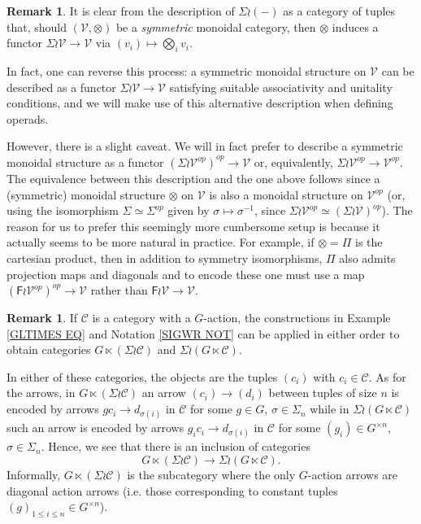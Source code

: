 \documentclass[a4paper,10pt
,draft
]{article}%
\numberwithin{equation}{section}
\numberwithin{figure}{section}
\theoremstyle{definition} %
\newtheorem{remark}[equation]{Remark}%
\newcommand{\V}{\ensuremath{\mathcal V}}
\newcommand{\C}{\ensuremath{\mathcal C}}
\newcommand{\1}{\ensuremath{\mathbbm 1}}%
\begin{document}
\begin{remark}
It is clear from the description
of $\Sigma \wr (-)$
as a category of tuples that, 
should $(\V,\otimes)$ be a \emph{symmetric} monoidal category,
then $\otimes$
induces a functor
$\Sigma \wr \V \to \mathcal{V}$
via $(v_i) \mapsto \bigotimes_i v_i$.

In fact, one can reverse this process: a symmetric monoidal structure on $\V$ can be described as a functor
$\Sigma \wr \V \to \V$
satisfying suitable associativity and unitality conditions, and we will make use of this alternative description when defining operads.

However, there is a slight caveat. 
We will in fact prefer to describe a symmetric monoidal structure
as a functor
$\left(\Sigma \wr \V^{op}\right)^{op} \to \V$
or, equivalently, 
$\Sigma \wr \V^{op} \to \V^{op}$.
The equivalence between this description and the one above
follows since a (symmetric) monoidal structure $\otimes$ on $\V$ is also a monoidal structure on $\V^{op}$
(or, using the isomorphism
$\Sigma \simeq \Sigma^{op}$ given by $\sigma \mapsto \sigma^{-1}$,
since $\Sigma \wr \V^{op} \simeq \left(\Sigma \wr \V \right)^{op}$).
The reason for us to prefer this seemingly more cumbersome setup is because it actually seems to be more natural in practice.
For example, if $\otimes = \Pi$ is the cartesian product, 
then in addition to symmetry isomorphisms, 
$\Pi$ also admits projection maps and diagonals and to encode these one must use a map
$\left(\mathsf{F} \wr \mathcal{V}^{op}\right)^{op} \to \mathcal{V}$
rather than
$\mathsf{F} \wr \mathcal{V} \to \mathcal{V}$.
\end{remark}




\begin{remark}\label{WRDIAG REM}
If $\mathcal{C}$ is a category with a $G$-action,
the constructions in 
Example \ref{GLTIMES EQ} and Notation \ref{SIGWR NOT}	
can be applied in either order to obtain categories
$G \ltimes (\Sigma \wr \mathcal{C})$
and
$\Sigma \wr (G \ltimes \mathcal{C})$.

In either of these categories, the objects are the tuples
$(c_i)$ with $c_i \in \mathcal{C}$.
%
As for the arrows,
in $G \ltimes (\Sigma \wr \mathcal{C})$
an arrow $(c_i) \to (d_i)$
between tuples of size $n$ is encoded by arrows 
$gc_i \to d_{\sigma(i)}$
in $\C$ for some $g\in G$, $\sigma \in \Sigma_n$
while in $\Sigma \wr (G \ltimes \mathcal{C})$
such an arrow is encoded by arrows
$g_i c_i \to d_{\sigma(i)}$
in $\C$ for some $(g_i) \in G^{\times n}$, $\sigma \in \Sigma_n$.
Hence, we see that there is an inclusion of categories
	\begin{equation} 
	G \ltimes (\Sigma \wr \mathcal C) \to \Sigma \wr (G \ltimes \mathcal C).
	\end{equation}
Informally, $G \ltimes (\Sigma \wr \mathcal C)$
is the subcategory where the only
$G$-action arrows are diagonal action arrows
(i.e. those corresponding to constant tuples $(g)_{1 \leq i \leq n} \in G^{\times n}$).
\end{remark}
\end{document}
